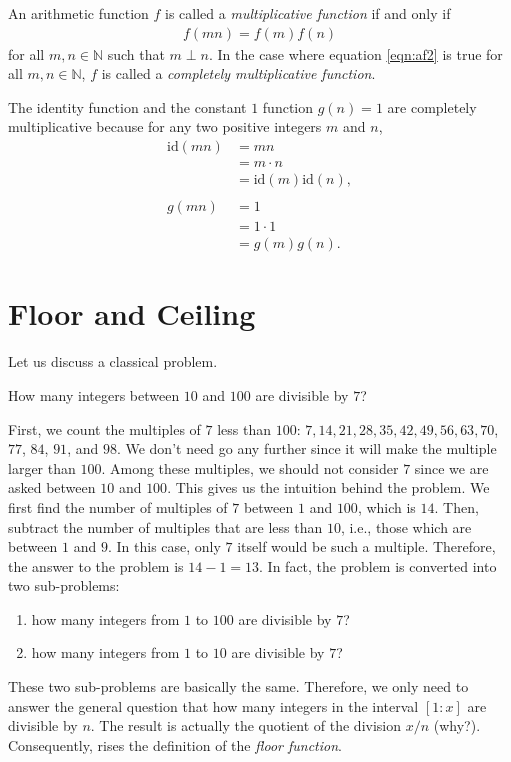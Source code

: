 \documentclass[12pt]{subfile}
\begin{document}
		\begin{definition}
			An arithmetic function $f$ is called a \textit{multiplicative function} if and only if
				\begin{align}
				f(mn)=f(m)f(n)\label{eqn:af2}
				\end{align}
			for all $m,n\in\mathbb{N}$ such that $m\perp n$. In the case where equation \ref{eqn:af2} is true for all $m,n\in\mathbb{N}$, $f$ is called a \textit{completely multiplicative function}.
		\end{definition}

		\begin{example}
			The identity function and the constant $1$ function $g(n)=1$ are completely multiplicative because for any two positive integers $m$ and $n$,
				\begin{align*}
					\text{id}(mn) &= mn \\
								  &= m \cdot n\\
								  &= \text{id}(m) \text{id}(n),\\
								  \\
							g(mn) &= 1\\
								  &= 1 \cdot 1\\
								  &= g(m)g(n).
				\end{align*}
		\end{example}
\section{Floor and Ceiling}
    Let us discuss a classical problem.
        \begin{problem} \label{floorproblem}
            How many integers between $10$ and $100$ are divisible by $7$?
        \end{problem}
    First, we count the multiples of $7$ less than $100$: $7, 14, 21, 28, 35, 42, 49, 56, 63, 70$, $77$, $84$, $91$, and $98$. We don't need go any further since it will make the multiple larger than $100$. Among these multiples, we should not consider $7$ since we are asked between $10$ and $100$. This gives us the intuition behind the problem. We first find the number of multiples of $7$ between $1$ and $100$, which is $14$. Then, subtract the number of multiples that are less than $10$, i.e., those which are between $1$ and $9$. In this case, only $7$ itself would be such a multiple. Therefore, the answer to the problem is $14-1=13$. In fact, the problem is converted into two sub-problems:
    	\begin{enumerate}
    		\item how many integers from $1$ to $100$ are divisible by $7$?
    		\item how many integers from $1$ to $10$ are divisible by $7$?
    	\end{enumerate}
    These two sub-problems are basically the same. Therefore, we only need to answer the general question that how many integers in the interval $[1:x]$ are divisible by $n$. The result is actually the quotient of the division $x/n$ (why?). Consequently, rises the definition of the \textit{floor function}.
\end{document}
